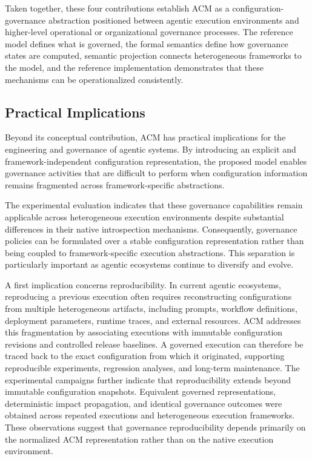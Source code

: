 \documentclass[10pt]{article}
\begin{document}
Taken together, these four contributions establish ACM as a configuration-governance abstraction positioned between agentic execution environments and higher-level operational or organizational governance processes. The reference model defines what is governed, the formal semantics define how governance states are computed, semantic projection connects heterogeneous frameworks to the model, and the reference implementation demonstrates that these mechanisms can be operationalized consistently.

\subsection{Practical Implications}
\label{sec:practical_implications}

Beyond its conceptual contribution, ACM has practical implications for the engineering and governance of agentic systems. By introducing an explicit and framework-independent configuration representation, the proposed model enables governance activities that are difficult to perform when configuration information remains fragmented across framework-specific abstractions.

The experimental evaluation indicates that these governance capabilities remain applicable across heterogeneous execution environments despite substantial differences in their native introspection mechanisms. Consequently, governance policies can be formulated over a stable configuration representation rather than being coupled to framework-specific execution abstractions. This separation is particularly important as agentic ecosystems continue to diversify and evolve.

A first implication concerns reproducibility. In current agentic ecosystems, reproducing a previous execution often requires reconstructing configurations from multiple heterogeneous artifacts, including prompts, workflow definitions, deployment parameters, runtime traces, and external resources. ACM addresses this fragmentation by associating executions with immutable configuration revisions and controlled release baselines. A governed execution can therefore be traced back to the exact configuration from which it originated, supporting reproducible experiments, regression analyses, and long-term maintenance. The experimental campaigns further indicate that reproducibility extends beyond immutable configuration snapshots. Equivalent governed representations, deterministic impact propagation, and identical governance outcomes were obtained across repeated executions and heterogeneous execution frameworks. These observations suggest that governance reproducibility depends primarily on the normalized ACM representation rather than on the native execution environment.
\end{document}
